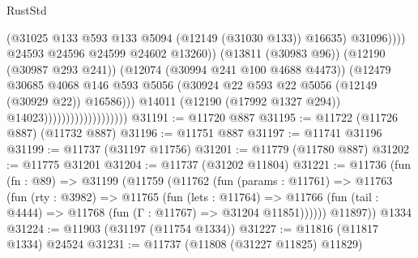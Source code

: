 \begin{lexlean}{RustStd}
\begin{coremodule}
                                                        (@31025
                                                          @133
                                                          @593
                                                          @133
                                                          @5094
                                                          (@12149 (@31030 @133))
                                                          @16635)
                                                        @31096))))
                                                @24593
                                                @24596
                                                @24599
                                                @24602
                                                @13260))
                                            (@13811 (@30983 @96))
                                            (@12190 (@30987 @293 @241))
                                            (@12074 (@30994 @241 @100 @4688 @4473))
                                            (@12479
                                              @30685
                                              @4068
                                              @146
                                              @593
                                              @5056
                                              (@30924
                                                @22
                                                @593
                                                @22
                                                @5056
                                                (@12149 (@30929 @22))
                                                @16586)))
                                          @14011
                                          (@12190 (@17992 @1327 @294))
                                          @14023)))))))))))))))))))
@31191 := @11720 @887
@31195 := @11722 (@11726 @887) (@11732 @887)
@31196 := @11751 @887
@31197 := @11741 @31196
@31199 := @11737 (@31197 @11756)
@31201 := @11779 (@11780 @887)
@31202 := @11775 @31201
@31204 := @11737 (@31202 @11804)
@31221 := @11736
    (fun (fn : @89) =>
    @31199
      (@11759
        (@11762
          (fun (params : @11761) =>
          @11763
            (fun (rty : @3982) =>
            @11765
              (fun (lets : @11764) =>
              @11766 (fun (tail : @4444) => @11768 (fun (Γ : @11767) => @31204 @11851))))))
        @11897))
    @1334
@31224 := @11903 (@31197 (@11754 @1334))
@31227 := @11816 (@11817 @1334) @24524
@31231 := @11737 (@11808 (@31227 @11825) @11829)

\end{coremodule}
\end{lexlean}
